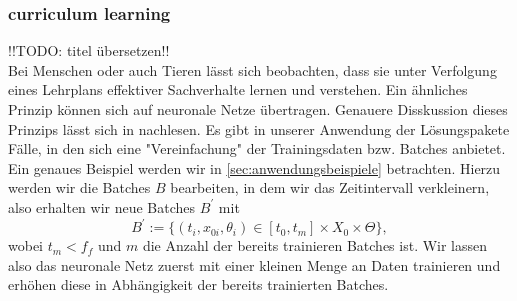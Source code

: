 \subsubsection{curriculum learning}
\label{subsec:curriculum-learning}
!!TODO: titel übersetzen!!\\
Bei Menschen oder auch Tieren lässt sich beobachten, dass sie unter Verfolgung eines Lehrplans effektiver Sachverhalte
lernen und verstehen. Ein ähnliches Prinzip können sich auf neuronale Netze übertragen. Genauere Disskussion dieses
Prinzips lässt sich in \cite{bengioCurriculumLearning2009} nachlesen. Es gibt in unserer Anwendung der Lösungspakete
Fälle, in den sich eine "Vereinfachung" der Trainingsdaten bzw. Batches anbietet. Ein genaues Beispiel werden wir in
\eqref{sec:anwendungsbeispiele} betrachten. Hierzu werden wir die Batches $B$ bearbeiten, in dem wir das Zeitintervall
verkleinern, also erhalten wir neue Batches $B^{\prime}$ mit
\[
    B^{\prime}:=  \{(t_i,x_{0i},\theta_i) \in [t_0,t_m] \times X_0 \times \Theta\},
\]
wobei $t_m<f_f$ und $m$ die Anzahl der bereits trainieren Batches ist. Wir lassen also das neuronale Netz zuerst mit
einer kleinen Menge an Daten trainieren und erhöhen diese in Abhängigkeit der bereits trainierten Batches.

